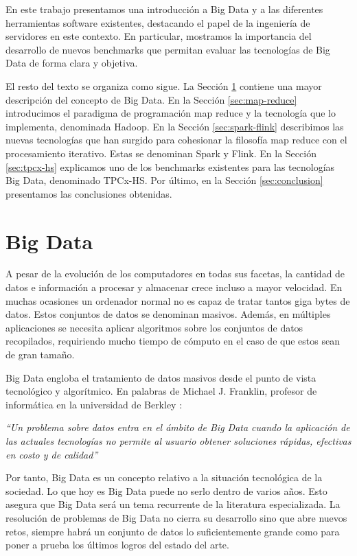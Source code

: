 \documentclass[10pt]{article}
\begin{document}
	En este trabajo presentamos una introducción a Big Data y a las diferentes herramientas software existentes, destacando el papel de la ingeniería de servidores en este contexto. En particular, mostramos la importancia del desarrollo de nuevos benchmarks que permitan evaluar las tecnologías de Big Data de forma clara y objetiva.

	El resto del texto se organiza como sigue. La Sección \ref{sec:big-data} contiene una mayor descripción del concepto de Big Data. En la Sección \ref{sec:map-reduce} introducimos el paradigma de programación map reduce y la tecnología que lo implementa, denominada Hadoop. En la Sección \ref{sec:spark-flink} describimos las nuevas tecnologías que han surgido para cohesionar la filosofía map reduce con el procesamiento iterativo. Estas se denominan Spark y Flink. En la Sección \ref{sec:tpcx-hs} explicamos uno de los benchmarks existentes para las tecnologías Big Data, denominado TPCx-HS. Por último, en la Sección \ref{sec:conclusion} presentamos las conclusiones obtenidas.

\section{Big Data} \label{sec:big-data}
	
	A pesar de la evolución de los computadores en todas sus facetas, la cantidad de datos e información a procesar y almacenar crece incluso a mayor velocidad. En muchas ocasiones un ordenador normal no es capaz de tratar tantos giga bytes de datos. Estos conjuntos de datos se denominan masivos. Además, en múltiples aplicaciones se necesita aplicar algoritmos sobre los conjuntos de datos recopilados, requiriendo mucho tiempo de cómputo en el caso de que estos sean de gran tamaño. 
	
	Big Data engloba el tratamiento de datos masivos desde el punto de vista tecnológico y algorítmico. En palabras de Michael J. Franklin, profesor de informática en la universidad de Berkley \cite{bd-definition}:
	
	\textit{``Un problema sobre datos entra en el ámbito de Big Data cuando la aplicación de las actuales tecnologías no permite al usuario obtener soluciones  rápidas, efectivas en costo y de calidad''}

	Por tanto, Big Data es un concepto relativo a la situación tecnológica de la sociedad. Lo que hoy es Big Data puede no serlo dentro de varios años. Esto asegura que Big Data será un tema recurrente de la literatura especializada. La resolución de problemas de Big Data no cierra su desarrollo sino que abre nuevos retos, siempre habrá un conjunto de datos lo suficientemente grande como para poner a prueba los últimos logros del estado del arte.
\end{document}

